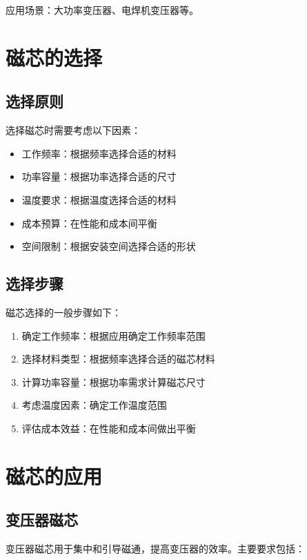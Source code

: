 \documentclass[12pt,UTF8]{ctexbook}
\begin{document}
应用场景：大功率变压器、电焊机变压器等。

\section{磁芯的选择}

\subsection{选择原则}

选择磁芯时需要考虑以下因素：

\begin{itemize}[leftmargin=2cm]
    \item 工作频率：根据频率选择合适的材料
    \item 功率容量：根据功率选择合适的尺寸
    \item 温度要求：根据温度选择合适的材料
    \item 成本预算：在性能和成本间平衡
    \item 空间限制：根据安装空间选择合适的形状
\end{itemize}

\subsection{选择步骤}

磁芯选择的一般步骤如下：

\begin{enumerate}[leftmargin=2cm]
    \item 确定工作频率：根据应用确定工作频率范围
    \item 选择材料类型：根据频率选择合适的磁芯材料
    \item 计算功率容量：根据功率需求计算磁芯尺寸
    \item 考虑温度因素：确定工作温度范围
    \item 评估成本效益：在性能和成本间做出平衡
\end{enumerate}

\section{磁芯的应用}

\subsection{变压器磁芯}

变压器磁芯用于集中和引导磁通，提高变压器的效率。主要要求包括：
\end{document}
